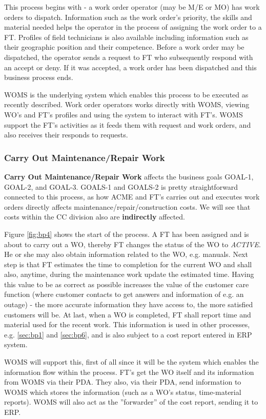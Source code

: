 This process begins with - a work order operator (may be M/E or MO) has work orders to dispatch. Information such as the work order's priority, the skills and material needed helps the operator in the process of assigning the work order to a FT. Profiles of field technicians is also available including information such as their geographic position and their competence. Before a work order may be dispatched, the operator sends a request to FT who subsequently respond with an accept or deny. If it was accepted, a work order has been dispatched and this business process ends.

WOMS is the underlying system which enables this process to be executed as recently described. Work order operators works directly with WOMS, viewing WO's and FT's profiles and using the system to interact with FT's. WOMS support the FT's activities as it feeds them with request and work orders, and also receives their responds to requests.
\subsubsection{Carry Out Maintenance/Repair Work}
\label{sec:bp4}
\textbf{Carry Out Maintenance/Repair Work} affects the business goals GOAL-1, GOAL-2, and GOAL-3. GOALS-1 and GOALS-2 is pretty straightforward connected to this process, as how ACME and FT's carries out and executes work orders directly affects maintenance/repair/construction costs. We will see that costs within the CC division also are \textbf{indirectly} affected.

Figure \ref{fig:bp4} shows the start of the process. A FT has been assigned and is about to carry out a WO, thereby FT changes the status of the WO to \emph{ACTIVE}. He or she may also obtain information related to the WO, e.g. manuals. Next step is that FT estimates the time to completion for the current WO and shall also, anytime, during the maintenance work update the estimated time. Having this value to be as correct as possible increases the value of the customer care function (where customer contacts to get answers and information of e.g. an outage) - the more accurate information they have access to, the more satisfied customers will be. At last, when a WO is completed, FT shall report time and material used for the recent work. This information is used in other processes, e.g. \ref{sec:bp1} and \ref{sec:bp6}, and is also subject to a cost report entered in ERP system.

WOMS will support this, first of all since it will be the system which enables the information flow within the process. FT's get the WO itself and its information from WOMS via their PDA. They also, via their PDA, send information to WOMS which stores the information (such as a WO's status, time-material reports). WOMS will also act as the ''forwarder'' of the cost report, sending it to ERP.
%
%
%
%
